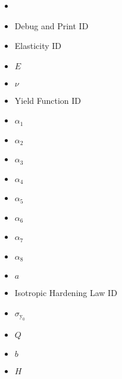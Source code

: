 \documentclass[11pt,a4paper,twoside,final,onecolumn,titlepage]{article}
\begin{document}
\begin{minipage}{0.6\textwidth}
	\begin{itemize}
		\item[]
		\item[] Debug and Print ID
		\item[] Elasticity ID
		\item[] $E$
		\item[] $\nu$
		\item[] Yield Function ID
		\item[] $\alpha_1$
		\item[] $\alpha_2$
		\item[] $\alpha_3$
		\item[] $\alpha_4$
		\item[] $\alpha_5$
		\item[] $\alpha_6$
		\item[] $\alpha_7$
		\item[] $\alpha_8$
		\item[] $a$
		\item[] Isotropic Hardening Law ID
		\item[] $\sigma_{\textrm{y}_0}$
		\item[] $Q$
		\item[] $b$
		\item[] $H$
	\end{itemize}
\end{minipage}
\end{document}
